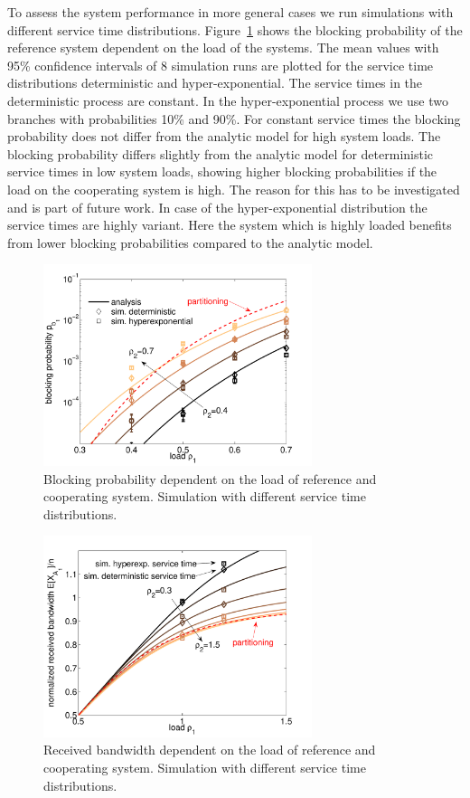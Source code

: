 To assess the system performance in more general cases we run simulations with different service time distributions.
Figure~\ref{fig:m2_n20_rho2_sim} shows the blocking probability of the reference system dependent on the load of the systems. The mean values with 95\% confidence intervals of 8 simulation runs are plotted for the service time distributions deterministic and hyper-exponential.
The service times in the deterministic process are constant.
In the hyper-exponential process we use two branches with probabilities 10\% and 90\%.
For constant service times the blocking probability does not differ from the analytic model for high system loads. The blocking probability differs slightly from the analytic model for deterministic service times in low system loads, showing higher blocking probabilities if the load on the cooperating system is high. The reason for this has to be investigated and is part of future work. In case of the hyper-exponential distribution the service times are highly variant. Here the system which is highly loaded benefits from lower blocking probabilities compared to the analytic model.

\begin{figure}[tb]
	\centering
	\includegraphics[width=0.7\textwidth]{aggregation/performance_model/figures/m2_n20_rho2_sim}
 	\caption{Blocking probability dependent on the load of reference and cooperating system. Simulation with different service time distributions.}
 	\label{fig:m2_n20_rho2_sim}
\end{figure}

\begin{figure}[tb]
	\centering
	\includegraphics[width=0.7\textwidth]{aggregation/performance_model/figures/bw_n20_rho2_sim}
 	\caption{Received bandwidth dependent on the load of reference and cooperating system. Simulation with different service time distributions.}
 	\label{fig:bw_n20_rho2_sim}
\end{figure}


